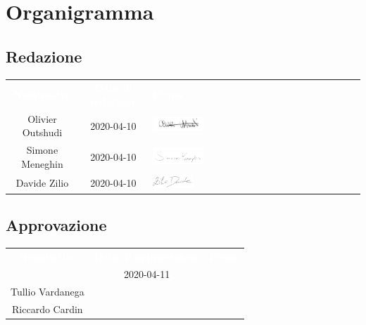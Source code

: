 \section{Organigramma}

\renewcommand{\arraystretch}{1.5}

\subsection{Redazione} 
\begin{table}[H]
	\begin{center}
	\begin{tabular}{ c c C{8cm} }
		\textcolor{white}{\textbf{Nominativo}} & \textcolor{white}{\textbf{Data di redazione}} & \textcolor{white}{\textbf{Firma}} \\
		Olivier Outshudi & 2020-04-10 & \includegraphics[scale=0.3, width=0.25\textwidth]{img/firme/outshudi.png}\\
		Simone Meneghin & 2020-04-10 & \includegraphics[scale=0.3, width=0.25\textwidth]{img/firme/meneghin.png}\\
		Davide Zilio & 2020-04-10 & \includegraphics[scale=0.2, width=0.2\textwidth]{img/firme/zilio.png}\\
	\end{tabular}
	\end{center}	
\end{table}

\subsection{Approvazione} 
\begin{table}[H]
	\begin{center}
	\begin{tabular}{ c c C{7.4cm} }
		\textcolor{white}{\textbf{Nominativo}} & \textcolor{white}{\textbf{Data di approvazione}} & \textcolor{white}{\textbf{Firma}} \\
		 & 2020-04-11 & \\
		Tullio Vardanega &  & \\
		Riccardo Cardin &  & \\
	\end{tabular}
	\end{center}	
\end{table}

